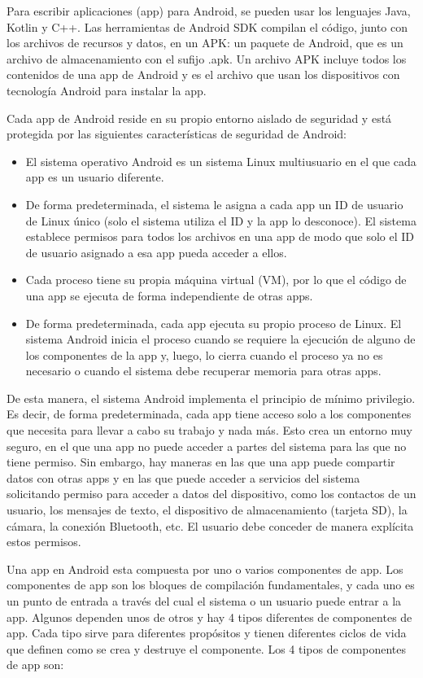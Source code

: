 Para escribir aplicaciones (app) para Android, se pueden usar los lenguajes Java, Kotlin y C++. Las herramientas de Android SDK compilan el código, junto con los archivos de recursos y datos, en un APK: un paquete de Android, que es un archivo de almacenamiento con el sufijo .apk. Un archivo APK incluye todos los contenidos de una app de Android y es el archivo que usan los dispositivos con tecnología Android para instalar la app.

Cada app de Android reside en su propio entorno aislado de seguridad y está protegida por las siguientes características de seguridad de Android:
\begin{itemize}
	\item El sistema operativo Android es un sistema Linux multiusuario en el que cada app es un usuario diferente.
	\item De forma predeterminada, el sistema le asigna a cada app un ID de usuario de Linux único (solo el sistema utiliza el ID y la app lo desconoce). El sistema establece permisos para todos los archivos en una app de modo que solo el ID de usuario asignado a esa app pueda acceder a ellos.
	\item Cada proceso tiene su propia máquina virtual (VM), por lo que el código de una app se ejecuta de forma independiente de otras apps.
	\item De forma predeterminada, cada app ejecuta su propio proceso de Linux. El sistema Android inicia el proceso cuando se requiere la ejecución de alguno de los componentes de la app y, luego, lo cierra cuando el proceso ya no es necesario o cuando el sistema debe recuperar memoria para otras apps.
\end{itemize}

De esta manera, el sistema Android implementa el principio de mínimo privilegio. Es decir, de forma predeterminada, cada app tiene acceso solo a los componentes que necesita para llevar a cabo su trabajo y nada más. Esto crea un entorno muy seguro, en el que una app no puede acceder a partes del sistema para las que no tiene permiso. Sin embargo, hay maneras en las que una app puede compartir datos con otras apps y en las que puede acceder a servicios del sistema solicitando permiso para acceder a datos del dispositivo, como los contactos de un usuario, los mensajes de texto, el dispositivo de almacenamiento (tarjeta SD), la cámara, la conexión Bluetooth, etc. El usuario debe conceder de manera explícita estos permisos.

Una app en Android esta compuesta por uno o varios componentes de app. Los componentes de app son los bloques de compilación fundamentales, y cada uno es un punto de entrada a través del cual el sistema o un usuario puede entrar a la app. Algunos dependen unos de otros y hay 4 tipos diferentes de componentes de app. Cada tipo sirve para diferentes propósitos y tienen diferentes ciclos de vida que definen como se crea y destruye el componente. Los 4 tipos de componentes de app son:

